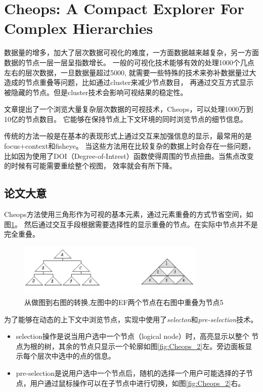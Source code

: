 \documentclass{article}
\begin{document}
\section{Cheops: A Compact Explorer For Complex Hierarchies\cite{Beaudoin1996}}
	数据量的增多，加大了层次数据可视化的难度，一方面数据越来越复杂，另一方面数据的节点一层一层呈指数增长。
	一般的可视化技术能够有效的处理1000个几点左右的层次数据，一旦数据量超过5000,
	就需要一些特殊的技术来弥补数据量过大造成的节点重叠等问题，比如通过cluster来减少节点数目，
	再通过交互方式显示被隐藏的节点。但是cluster技术会影响可视结果的稳定性。

	文章提出了一个浏览大量复杂层次数据的可视技术，Cheops，可以处理1000万到10亿的节点数目。
	它能够在保持节点上下文环境的同时浏览节点的细节信息。

	传统的方法一般是在基本的表现形式上通过交互来加强信息的显示，最常用的是focus+context和fisheye。
	当这些方法用在比较复杂的数据上时会存在一些问题，
	比如因为使用了DOI（Degree-of-Intrest）函数使得周围的节点扭曲。当焦点改变的时候有可能需要重绘整个视图，
	效率就会有所下降。

	\subsection{论文大意}
	Cheops方法使用三角形作为可视的基本元素，通过元素重叠的方式节省空间，如图\ref{fig:Cheops_1}。
	然后通过交互手段根据需要选择性的显示重叠的节点。在实际中节点并不是完全重叠。

	\begin{figure}[h]
		\centering
		\includegraphics[width=0.8\textwidth]{_img/Cheops_1.png}
		\caption{从做图到右图的转换,左图中的EF两个节点在右图中重叠为节点5}
		\label{fig:Cheops_1}
	\end{figure}

	为了能够在动态的上下文中浏览节点，实现中使用了\emph{selecton}和\emph{pre-selection}技术。

	\begin{itemize}
		\item selection操作是说当用户选中一个节点（logical node）时，高亮显示以整个
			节点为根的树，其余的节点只显示一个轮廓如图\ref{fig:Cheops_2}左。旁边面板显示每个层次中选中的点的信息。
		\item pre-selection是说用户选中一个节点后，随机的选择一个用户可能选择的子节
			点，用户通过鼠标操作可以在子节点中进行切换，如图\ref{fig:Cheops_2}右。
	\end{itemize}
\end{document}
